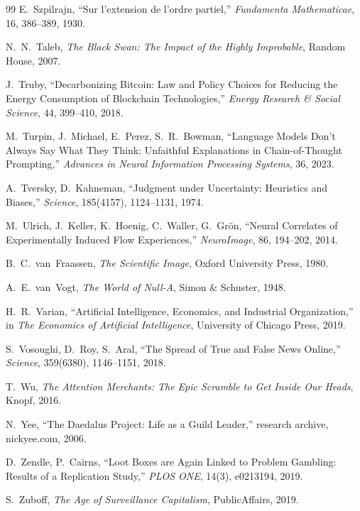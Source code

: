 \begin{thebibliography}{99}
E.~Szpilrajn, ``Sur l'extension de l'ordre partiel,'' \textit{Fundamenta Mathematicae}, 16, 386--389, 1930.

N.~N.~Taleb, \textit{The Black Swan: The Impact of the Highly Improbable}, Random House, 2007.

J.~Truby, ``Decarbonizing Bitcoin: Law and Policy Choices for Reducing the Energy Consumption of Blockchain Technologies,'' \textit{Energy Research \& Social Science}, 44, 399--410, 2018.

M.~Turpin, J.~Michael, E.~Perez, S.~R.~Bowman, ``Language Models Don't Always Say What They Think: Unfaithful Explanations in Chain-of-Thought Prompting,'' \textit{Advances in Neural Information Processing Systems}, 36, 2023.

A.~Tversky, D.~Kahneman, ``Judgment under Uncertainty: Heuristics and Biases,'' \textit{Science}, 185(4157), 1124--1131, 1974.

M.~Ulrich, J.~Keller, K.~Hoenig, C.~Waller, G.~Grön, ``Neural Correlates of Experimentally Induced Flow Experiences,'' \textit{NeuroImage}, 86, 194--202, 2014.

B.~C.~van~Fraassen, \textit{The Scientific Image}, Oxford University Press, 1980.

A.~E.~van~Vogt, \textit{The World of Null-A}, Simon \& Schuster, 1948.

H.~R.~Varian, ``Artificial Intelligence, Economics, and Industrial Organization,'' in \textit{The Economics of Artificial Intelligence}, University of Chicago Press, 2019.

S.~Vosoughi, D.~Roy, S.~Aral, ``The Spread of True and False News Online,'' \textit{Science}, 359(6380), 1146--1151, 2018.

T.~Wu, \textit{The Attention Merchants: The Epic Scramble to Get Inside Our Heads}, Knopf, 2016.

N.~Yee, ``The Daedalus Project: Life as a Guild Leader,'' research archive, nickyee.com, 2006.

D.~Zendle, P.~Cairns, ``Loot Boxes are Again Linked to Problem Gambling: Results of a Replication Study,'' \textit{PLOS ONE}, 14(3), e0213194, 2019.

S.~Zuboff, \textit{The Age of Surveillance Capitalism}, PublicAffairs, 2019.


\end{thebibliography}
